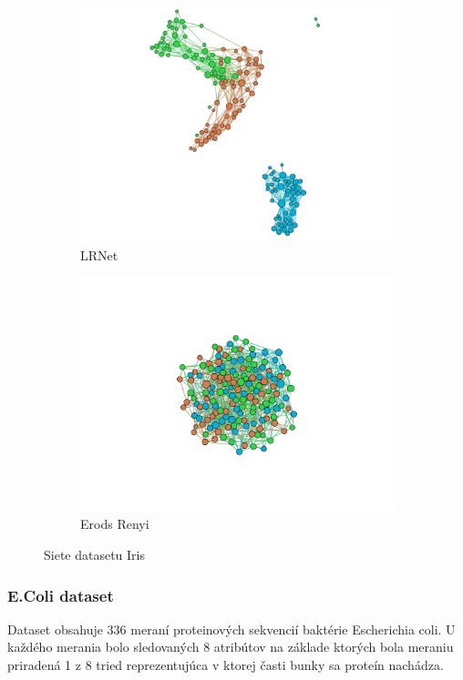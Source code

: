 \documentclass[slovak,master,dept460,male,cpp,cpdeclaration]{diploma}
\begin{document}
\begin{figure}[H]
\begin{subfigure}{0.45\textwidth}
    \includegraphics[width=\linewidth, frame]{Graphs/network_iris_lrnet.jpg}
    \caption{LRNet}
    \label{fig:wine_lrnet}
\end{subfigure}\hfil
\begin{subfigure}{0.45\textwidth}
    \centering
    \includegraphics[width=\linewidth, frame]{Graphs/network_iris_erdos_renyi.jpg}
    \caption{Erods Renyi}
    \label{fig:wine_erdos_renyi}
\end{subfigure}
\caption{Siete datasetu Iris}
\label{fig:wine_networks}
\end{figure}


\subsubsection{E.Coli dataset}
Dataset obsahuje 336 meraní proteinových sekvencií baktérie Escherichia coli. U každého merania bolo sledovaných 8 atribútov na základe ktorých bola meraniu priradená 1 z 8 tried reprezentujúca v ktorej časti bunky sa proteín nachádza. \cite{E.Coli}
\end{document}
